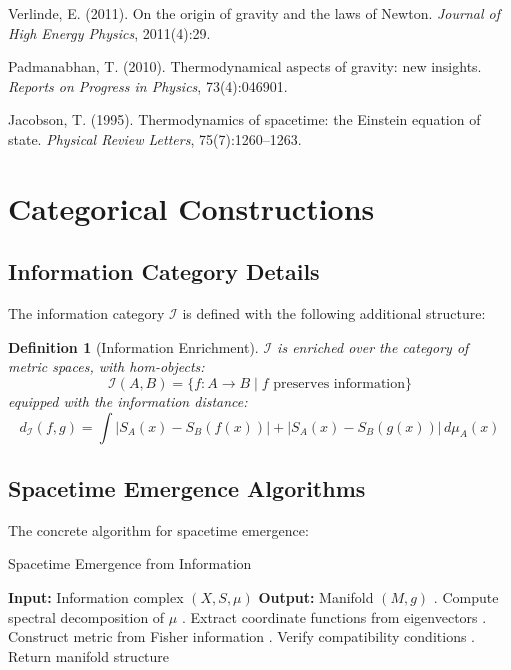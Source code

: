 \documentclass{article}
\newtheorem{definition}[theorem]{Definition}
\begin{document}
\begin{thebibliography}{99}
Verlinde, E. (2011). 
\newblock On the origin of gravity and the laws of Newton. 
\newblock \emph{Journal of High Energy Physics}, 2011(4):29.

Padmanabhan, T. (2010). 
\newblock Thermodynamical aspects of gravity: new insights. 
\newblock \emph{Reports on Progress in Physics}, 73(4):046901.

Jacobson, T. (1995). 
\newblock Thermodynamics of spacetime: the Einstein equation of state. 
\newblock \emph{Physical Review Letters}, 75(7):1260--1263.

\end{thebibliography}

\appendix

\section{Categorical Constructions}

\subsection{Information Category Details}

The information category $\mathcal{I}$ is defined with the following additional structure:

\begin{definition}[Information Enrichment]
$\mathcal{I}$ is enriched over the category of metric spaces, with hom-objects:
\begin{equation}
\mathcal{I}(A, B) = \{f: A \to B \mid f \text{ preserves information}\}
\end{equation}
equipped with the information distance:
\begin{equation}
d_{\mathcal{I}}(f, g) = \int |S_A(x) - S_B(f(x))| + |S_A(x) - S_B(g(x))| \, d\mu_A(x)
\end{equation}
\end{definition}

\subsection{Spacetime Emergence Algorithms}

The concrete algorithm for spacetime emergence:

\begin{algorithm}
\caption{Spacetime Emergence from Information}
\begin{algorithmic}
\STATE \textbf{Input:} Information complex $(X, S, \mu)$
\STATE \textbf{Output:} Manifold $(M, g)$
\STATE 
{}. Compute spectral decomposition of $\mu$
. Extract coordinate functions from eigenvectors
. Construct metric from Fisher information
. Verify compatibility conditions
. Return manifold structure
\end{algorithmic}
\end{algorithm}
\end{document}
